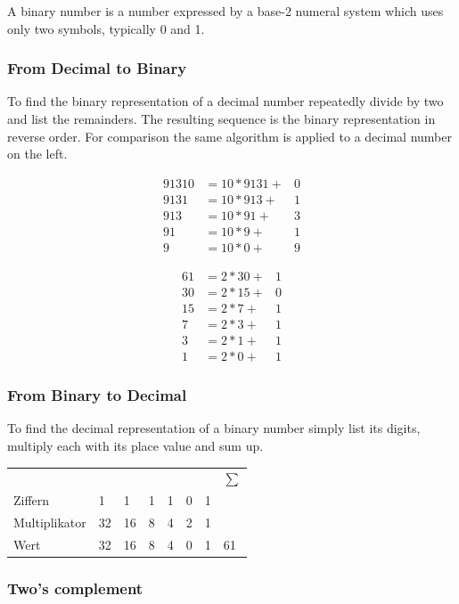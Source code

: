 \documentclass[10pt,a4paper]{scrartcl}
\begin{document}
\begin{multicols*}{2}
A binary number is a number expressed by a base-2 numeral system which uses only two symbols, typically 0 and 1.

\subsubsection{From Decimal to Binary}

To find the binary representation of a decimal number repeatedly divide by two and list the remainders. The resulting sequence is the binary representation in reverse order. For comparison the same algorithm is applied to a decimal number on the left.

\begin{minipage}{0.45\linewidth}
\begin{align*}
91310&=10*9131+&0\\
9131&=10*913+&1\\
913&=10*91+&3\\
91&=10*9+&1\\
9&=10*0+&9
\end{align*}
\end{minipage}
\hfill
\begin{minipage}{0.45\linewidth}
\begin{align*}
61&=2*30+&1\\
30&=2*15+&0\\
15&=2*7+&1\\
7&=2*3+&1\\
3&=2*1+&1\\
1&=2*0+&1
\end{align*}
\end{minipage}

\subsubsection{From Binary to Decimal}

To find the decimal representation of a binary number simply list its digits, multiply each with its place value and sum up.

\begin{tabular}{llllllll}
&&&&&&&$\sum$\\
Ziffern&1&1&1&1&0&1\\
Multiplikator&32&16&8&4&2&1\\
Wert&32&16&8&4&0&1&61\\
\end{tabular}

\subsubsection{Two's complement}


\end{multicols*}
\end{document}
